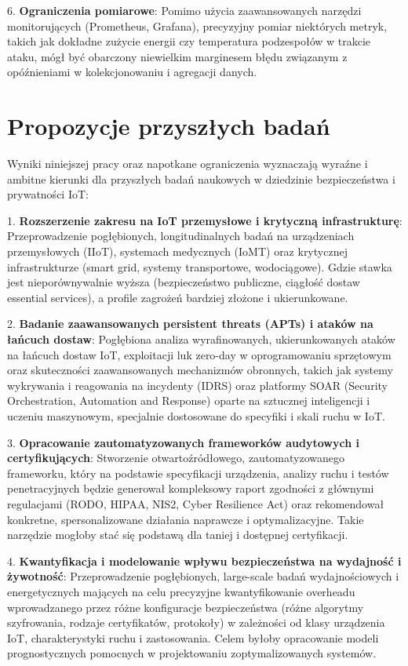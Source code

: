 6.  \textbf{Ograniczenia pomiarowe}: Pomimo użycia zaawansowanych narzędzi monitorujących (Prometheus, Grafana), precyzyjny pomiar niektórych metryk, takich jak dokładne zużycie energii czy temperatura podzespołów w trakcie ataku, mógł być obarczony niewielkim marginesem błędu związanym z opóźnieniami w kolekcjonowaniu i agregacji danych.

\section{Propozycje przyszłych badań}

Wyniki niniejszej pracy oraz napotkane ograniczenia wyznaczają wyraźne i ambitne kierunki dla przyszłych badań naukowych w dziedzinie bezpieczeństwa i prywatności IoT:

1.  \textbf{Rozszerzenie zakresu na IoT przemysłowe i krytyczną infrastrukturę}: Przeprowadzenie pogłębionych, longitudinalnych badań na urządzeniach przemysłowych (IIoT), systemach medycznych (IoMT) oraz krytycznej infrastrukturze (smart grid, systemy transportowe, wodociągowe). Gdzie stawka jest nieporównywalnie wyższa (bezpieczeństwo publiczne, ciągłość dostaw essential services), a profile zagrożeń bardziej złożone i ukierunkowane.

2.  \textbf{Badanie zaawansowanych persistent threats (APTs) i ataków na łańcuch dostaw}: Pogłębiona analiza wyrafinowanych, ukierunkowanych ataków na łańcuch dostaw IoT, exploitacji luk zero-day w oprogramowaniu sprzętowym oraz skuteczności zaawansowanych mechanizmów obronnych, takich jak systemy wykrywania i reagowania na incydenty (IDRS) oraz platformy SOAR (Security Orchestration, Automation and Response) oparte na sztucznej inteligencji i uczeniu maszynowym, specjalnie dostosowane do specyfiki i skali ruchu w IoT.

3.  \textbf{Opracowanie zautomatyzowanych frameworków audytowych i certyfikujących}: Stworzenie otwartoźródłowego, zautomatyzowanego frameworku, który na podstawie specyfikacji urządzenia, analizy ruchu i testów penetracyjnych będzie generował kompleksowy raport zgodności z głównymi regulacjami (RODO, HIPAA, NIS2, Cyber Resilience Act) oraz rekomendował konkretne, spersonalizowane działania naprawcze i optymalizacyjne. Takie narzędzie mogłoby stać się podstawą dla taniej i dostępnej certyfikacji.

4.  \textbf{Kwantyfikacja i modelowanie wpływu bezpieczeństwa na wydajność i żywotność}: Przeprowadzenie pogłębionych, large-scale badań wydajnościowych i energetycznych mających na celu precyzyjne kwantyfikowanie overheadu wprowadzanego przez różne konfiguracje bezpieczeństwa (różne algorytmy szyfrowania, rodzaje certyfikatów, protokoły) w zależności od klasy urządzenia IoT, charakterystyki ruchu i zastosowania. Celem byłoby opracowanie modeli prognostycznych pomocnych w projektowaniu zoptymalizowanych systemów.

